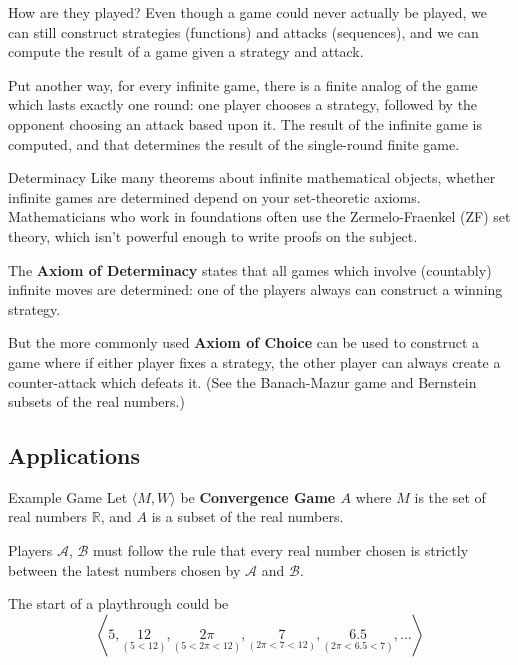 \documentclass{beamer}
\theoremstyle{theorem}
\theoremstyle{definition}
\newcommand{\<}{\langle}
\renewcommand{\>}{\rangle}
\newcommand{\pl}[1]{\mathscr{#1}}
\newcommand{\vpause}{\pause\vspace{1em}}
\newcommand{\term}[1]{\textbf{#1}}
\begin{document}
\begin{frame}{How are they played?}
  Even though a game could never actually be played, we can still construct
  strategies (functions) and attacks (sequences), and we can compute the
  result of a game given a strategy and attack.

  \vpause

  Put another way, for every infinite game, there is a finite analog of the
  game which lasts exactly one round: one player chooses a strategy, followed
  by the opponent choosing an attack based upon it. The result of the infinite
  game is computed, and that determines the result of the single-round finite
  game.
\end{frame}

\begin{frame}{Determinacy}
  Like many theorems about infinite mathematical objects, whether infinite
  games are determined depend on your set-theoretic axioms. Mathematicians who
  work in foundations often use the Zermelo-Fraenkel (ZF) set theory, which
  isn't powerful enough to write proofs on the subject.

  \vpause

  The \term{Axiom of Determinacy} states that all games which
  involve (countably) infinite moves are determined: one of the players always
  can construct a winning strategy.

  \vpause

  But the more commonly used \term{Axiom of Choice} can be used to construct
  a game where if either player fixes a strategy, the other player can always
  create a counter-attack which defeats it. (See the Banach-Mazur game and
  Bernstein subsets of the real numbers.)
\end{frame}

\subsection{Applications}

\begin{frame}{Example Game}
  Let $\<M,W\>$ be \term{Convergence Game $A$} where $M$ is the set of real
  numbers $\mathbb{R}$, and $A$ is a subset of the real numbers.

  \vpause

  Players $\pl A$, $\pl B$ must follow the rule that every real number chosen is
  strictly between the latest numbers chosen by $\pl A$ and $\pl B$.

  \vpause

  The start of a playthrough could be
    \[
      \left\<
        5,
        \underset{(5<12)}{12},
        \underset{(5<2\pi<12)}{2\pi},
        \underset{(2\pi<7<12)}{7},
        \underset{(2\pi<6.5<7)}{6.5},
        \dots
      \right\>
    \]
\end{frame}
\end{document}
